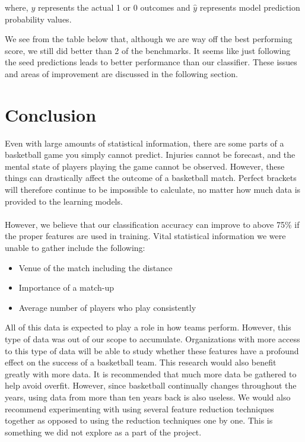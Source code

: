 \documentclass{article}
\begin{document}
\begin{multicols}{2}
	 where, $y$ represents the actual 1 or 0 outcomes and $\hat{y}$ represents model prediction probability values. 
	 
	 \begin{center}		
	\end{center}
	
	We see from the table below that, although we are way off the best performing score, we still did better than 2 of the benchmarks. It seems like just following the seed predictions leads to better performance than our classifier. These issues and areas of improvement are discussed in the following section.
	 
	\section{Conclusion}	 
Even with large amounts of statistical information, there are some parts of a basketball game you simply cannot predict. Injuries cannot be forecast, and the mental state of players playing the game cannot be observed. However, these things can drastically affect the outcome of a basketball match. Perfect brackets will therefore continue to be impossible to calculate, no matter how much data is provided to the learning models.

\paragraph{}However, we believe that our classification accuracy can improve to above 75\% if the proper features are used in training. Vital statistical information we were unable to gather include the following:
\begin{itemize}
\item
Venue of the match including the distance
\item
Importance of a match-up
\item
Average number of players who play consistently
\end{itemize}

All of this data is expected to play a role in how teams perform. However, this type of data was out of our scope to accumulate. Organizations with more access to this type of data will be able to study whether these features have a profound effect on the success of a basketball team. This research would also benefit greatly with more data. It is recommended that much more data be gathered to help avoid overfit. However, since basketball continually changes throughout the years, using data from more than ten years back is also useless. We would also recommend experimenting with using several feature reduction techniques together as opposed to using the reduction techniques one by one. This is something we did not explore as a part of the project.


\end{multicols}
\end{document}
